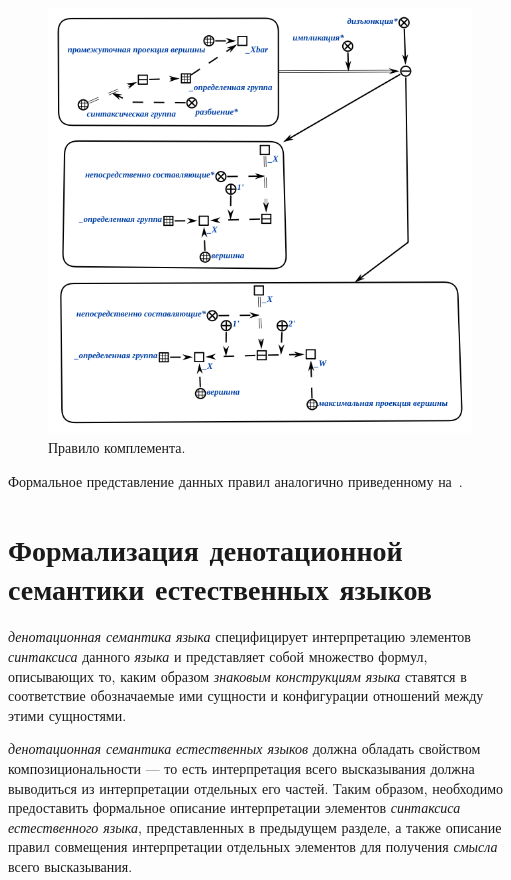 \begin{figure}[h]
    \centering
    \includegraphics[scale=0.8]{images/part2/chapter_lang/complement_rule}
    \caption{Правило комплемента.}
    \label{fig:complement_rule}
\end{figure}


Формальное представление данных правил аналогично приведенному на~\textit{}.

\section{Формализация денотационной семантики естественных языков}
\label{section_natural_language_denotational_semantics_formalization}

\textit{денотационная семантика} \textit{языка} специфицирует интерпретацию элементов \textit{синтаксиса} данного \textit{языка} и представляет собой множество формул, описывающих то, каким образом \textit{знаковым конструкциям} \textit{языка} ставятся в соответствие обозначаемые ими сущности и конфигурации отношений между этими сущностями.

\textit{денотационная семантика} \textit{естественных языков} должна обладать свойством композициональности --- то есть интерпретация всего высказывания должна выводиться из интерпретации отдельных его частей.
Таким образом, необходимо предоставить формальное описание интерпретации элементов \textit{синтаксиса} \textit{естественного языка}, представленных в предыдущем разделе, а также описание правил совмещения интерпретации отдельных элементов для получения \textit{смысла} всего высказывания.

